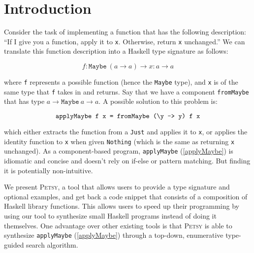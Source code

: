 \documentclass[acmsmall,nonacm]{acmart}
\begin{document}

\section{Introduction}


Consider the task of implementing a function that has the following 
description: ``If I give you a function, apply it to \verb|x|. Otherwise, 
return \verb|x| unchanged.'' We can translate this function description 
into a Haskell type signature as follows: 

\begin{equation*}
  f:\texttt{Maybe}~(a \to a) \to x:a \to a
\end{equation*}


\noindent where \verb|f| represents a possible function (hence the \verb|Maybe| type), and 
\verb|x| is of the same type that \verb|f| takes in and returns. 
Say that we have a component \texttt{fromMaybe} that has type $a \to \texttt{Maybe} ~a \to a$.
A possible solution to this problem is:

\begin{equation}
  \label{applyMaybe}
  \verb|applyMaybe f x = fromMaybe (\y -> y) f x|
\end{equation}

\noindent which either extracts the function from a \verb|Just| and applies it to \verb|x|, 
or applies the identity function to \verb|x| when given \verb|Nothing|
(which is the same as returning \verb|x| unchanged). As a component-based program,
\texttt{applyMaybe} (\ref{applyMaybe}) is idiomatic and concise and doesn't rely on if-else or pattern matching.
But finding it is potentially non-intuitive.

We present \textsc{Petsy}, a tool that allows users to provide a type signature and 
optional examples, and get back a code snippet 
that consists of a composition of Haskell library functions. 
This allows
users to speed up their programming by using our tool to synthesize small 
Haskell programs instead of doing it themselves. 
One advantage over other existing tools is that
\textsc{Petsy} is able to synthesize \texttt{applyMaybe} (\ref{applyMaybe}) through a top-down,
enumerative type-guided search algorithm.
\end{document}
